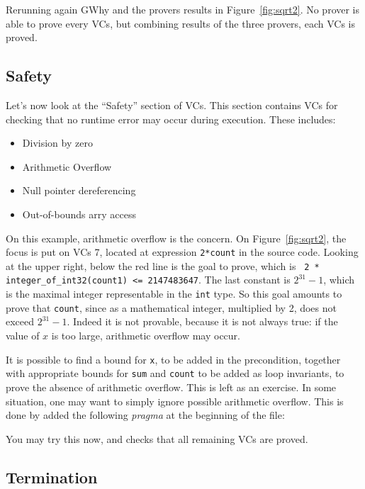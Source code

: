 \documentclass[a4paper,11pt,twoside,openright]{report}
\begin{document}
Rerunning again GWhy and the provers results in
Figure~\ref{fig:sqrt2}. No prover is able to prove every VCs, but
combining results of the three provers, each VCs is proved.

\subsection*{Safety}

Let's now look at the ``Safety'' section of VCs. This section contains
VCs for checking that no runtime error may occur during
execution. These includes:
\begin{itemize}
\item Division by zero
\item Arithmetic Overflow
\item Null pointer dereferencing
\item Out-of-bounds arry access
\end{itemize}

On this example, arithmetic overflow is the concern. On
Figure~\ref{fig:sqrt2}, the focus is put on VCs 7, located at
expression \texttt{2*count} in the source code. Looking at the upper
right, below the red line is the goal to prove, which is \texttt{ 2 *
  integer\_of\_int32(count1) <= 2147483647}. The last constant is
$2^{31}-1$, which is the maximal integer representable in the
\texttt{int} type. So this goal amounts to prove that \texttt{count},
since as a mathematical integer, multiplied by 2, does not exceed
$2^{31}-1$. Indeed it is not provable, because it is not always true:
if the value of $x$ is too large, arithmetic overflow may occur.

It is possible to find a bound for \texttt{x}, to be added in the
precondition, together with appropriate bounds for \texttt{sum} and
\texttt{count} to be added as loop invariants, to prove the absence of
arithmetic overflow. This is left as an exercise. In some situation,
one may want to simply ignore possible arithmetic overflow. This is
done by added the following \emph{pragma} at the beginning of the
file:


You may try this now, and checks that all remaining VCs are proved.

\subsection*{Termination}
\end{document}
